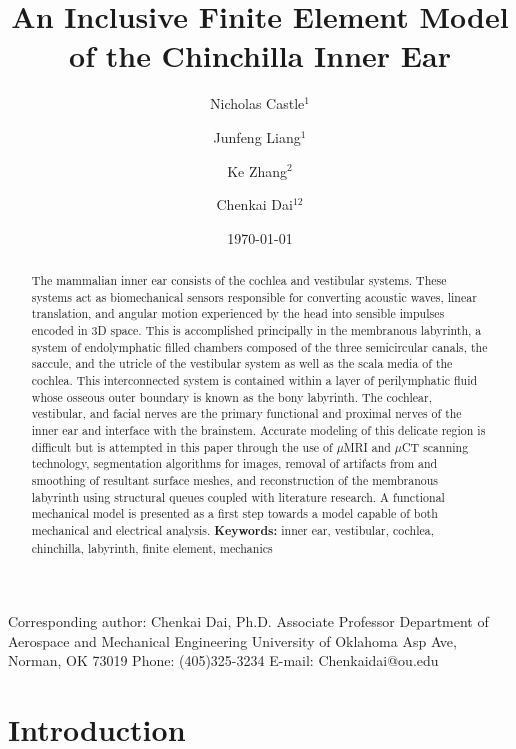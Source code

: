\documentclass[12pt]{article}
\title{\textbf{An Inclusive Finite Element Model of the Chinchilla Inner Ear}}
\author{Nicholas Castle$^1$ \and Junfeng Liang$^1$\and Ke Zhang$^2$\and Chenkai Dai$^{12}$}
\institute{$^1$School of Aerospace and Mechanical Engineering \\ $^2$Stephenson School of Biomedical Engineering \\ University of Oklahoma, Norman OK 73019}
\date{\today}
\begin{document}
\maketitle

\noindent Corresponding author: \newline
Chenkai Dai, Ph.D. \newline
Associate Professor \newline
Department of Aerospace and Mechanical Engineering \newline
University of Oklahoma  Asp Ave, \newline
Norman, OK 73019 \newline
Phone: (405)325-3234 \newline
E-mail: Chenkaidai@ou.edu \newline


\begin{abstract}
The mammalian inner ear consists of the cochlea and vestibular systems. These systems act as biomechanical sensors responsible for converting acoustic waves, linear translation, and angular motion experienced by the head into sensible impulses encoded in 3D space. This is accomplished principally in the membranous labyrinth, a system of endolymphatic filled chambers composed of the three semicircular canals, the saccule, and the utricle of the vestibular system as well as the scala media of the cochlea. This interconnected system is contained within a layer of perilymphatic fluid whose osseous outer boundary is known as the bony labyrinth. The cochlear, vestibular, and facial nerves are the primary functional and proximal nerves of the inner ear and interface with the brainstem. Accurate modeling of this delicate region is difficult but is attempted in this paper through the use of $\mu$MRI and $\mu$CT scanning technology, segmentation algorithms for images, removal of artifacts from and smoothing of resultant surface meshes, and reconstruction of the membranous labyrinth using structural queues coupled with literature research. A functional mechanical model is presented as a first step towards a model capable of both mechanical and electrical analysis. \newline \newline \textbf{Keywords:} inner ear, vestibular, cochlea, chinchilla, labyrinth, finite element, mechanics
\end{abstract}


\section{Introduction}
\end{document}
